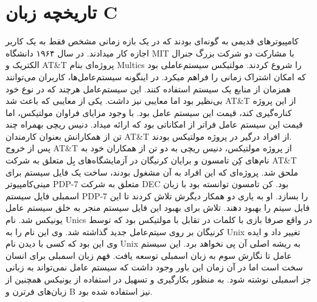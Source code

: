 \section{تاریخچه زبان C}
کامپیوترهای قدیمی به گونه‌ای بودند که در یک بازه زمانی مشخص فقط به یک کاربر اجازه کار میدادند. در سال ۱۹۶۴ دانشگاه MIT با مشارکت دو شرکت بزرگ جنرال الکتریک و AT\&T پروژه‌ای بنام Multics را شروع کردند. مولتیکس سیستم‌عاملی بود که امکان اشتراک زمانی را فراهم میکرد. در اینگونه سیستم‌عامل‌ها، کاربران می‌توانند همزمان از منابع یک سیستم استفاده کنند. این سیستم‌عامل هرچند که در نوع خود بی‌نظیر بود اما معایبی نیز داشت. یکی از معایبی که باعث شد AT\&T از این پروژه کناره‌گیری کند، قیمت این سیستم عامل بود. با وجود مزایای فراوان مولتیکس، اما قیمت این سیستم عامل فراتر از امکاناتی بود که ارائه میداد. دنیس ریچی بهمراه چند تن از همکارانش بعنوان کارمندان AT\&T از افراد درگیر در پروژه مولتیکس بودند.\\پس از خروج AT\&T از پروژه مولتیکس،‌ دنیس ریچی به دو تن از همکاران خود به نام‌های کِن تامسون و برایان کرنیگان در آزمایشگاه‌های بِل متعلق به شرکت AT\&T ملحق شد. پروژه‌ای که این افراد به آن مشغول بودند، ساخت یک فایل سیستم  برای مینی‌کامپیوتر PDP-7 متعلق به شرکت DEC بود. کن تامسون توانسته بود با زبان اسمبلی فایل سیستم PDP-7 را بسازد. او به یاری دو همکار دیگرش تلاش کردند تا این فایل سیتم را بهبود دهند. تلاش برای بهبود این فایل سیستم منجر به خلق سیستم عامل یونیکس شد. نام Unics در واقع صرفا بازی با کلمات در تقابل با مولتیکس بود که توسط کرنیگان بر روی سیتم‌عامل جدید گذاشته شد. وی این نام را به Unix تغییر داد و ایده وی این بود که کسی با دیدن نام Unix به ریشه اصلی آن پی نخواهد برد. این سیستم عامل تا نگارش سوم به زبان اسمبلی توسعه یافت. فهم زبان اسمبلی برای انسان سخت است اما در آن زمان این باور وجود داشت که سیستم عامل نمی‌تواند به زبانی جز اسمبلی نوشته شود. به منظور بکارگیری و تسهیل در استفاده از یونیکس همچنین از زبان‌های فرترن و B نیز استفاده شده بود.

